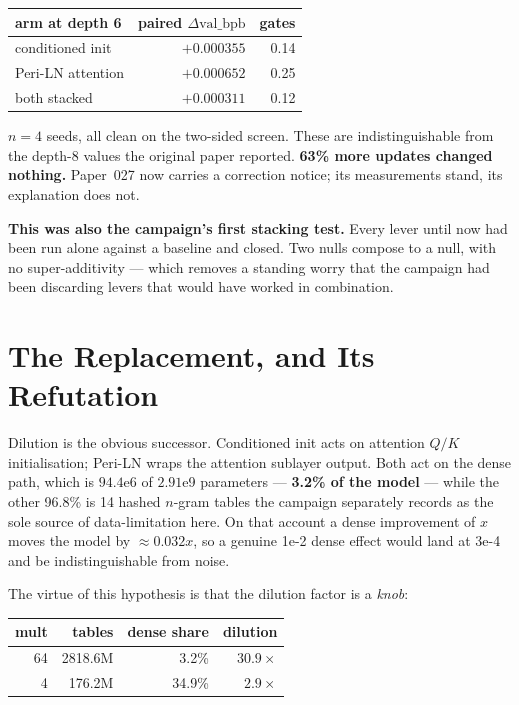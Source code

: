 \documentclass{article}
\newcommand{\vb}{\mathrm{val\_bpb}}
\begin{document}
\begin{center}\begin{small}
\begin{tabular}{lrr}
\toprule
arm at depth 6 & paired $\Delta\vb$ & gates \\
\midrule
conditioned init & $+0.000355$ & 0.14 \\
Peri-LN attention & $+0.000652$ & 0.25 \\
both stacked & $+0.000311$ & 0.12 \\
\bottomrule
\end{tabular}
\end{small}\end{center}

$n{=}4$ seeds, all clean on the two-sided screen. These are indistinguishable from the depth-8 values the original paper reported. \textbf{63\% more updates changed nothing.} Paper~027 now carries a correction notice; its measurements stand, its explanation does not.

\textbf{This was also the campaign's first stacking test.} Every lever until now had been run alone against a baseline and closed. Two nulls compose to a null, with no super-additivity --- which removes a standing worry that the campaign had been discarding levers that would have worked in combination.

\section{The Replacement, and Its Refutation}
Dilution is the obvious successor. Conditioned init acts on attention $Q/K$ initialisation; Peri-LN wraps the attention sublayer output. Both act on the dense path, which is $94.4$e6 of $2.91$e9 parameters --- \textbf{3.2\% of the model} --- while the other 96.8\% is 14 hashed $n$-gram tables the campaign separately records as the sole source of data-limitation here. On that account a dense improvement of $x$ moves the model by $\approx0.032x$, so a genuine 1e-2 dense effect would land at 3e-4 and be indistinguishable from noise.

The virtue of this hypothesis is that the dilution factor is a \emph{knob}:

\begin{center}\begin{small}
\begin{tabular}{rrrr}
\toprule
mult & tables & dense share & dilution \\
\midrule
64 & 2818.6M & 3.2\% & $30.9\times$ \\
4 & 176.2M & 34.9\% & $2.9\times$ \\
\bottomrule
\end{tabular}
\end{small}\end{center}
\end{document}
